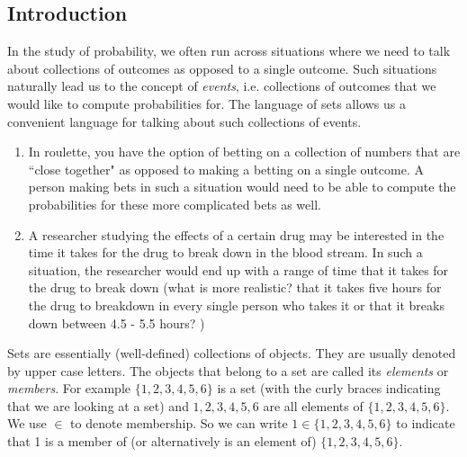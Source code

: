 \begin{appendices}
\section{Introduction}
		\noindent In the study of probability, we often run across situations where we need to talk about collections of outcomes as opposed to a single outcome. Such situations naturally lead us to the concept of \textit{events}, i.e. collections of outcomes that we would like to compute probabilities for. The language of sets allows us a convenient language for talking about such collections of events. 
		
		\begin{ex} 
			\begin{enumerate}
				\item In roulette, you have the option of betting on a collection of numbers that are ``close together" as opposed to making a betting on a single outcome. A person making bets in such a situation would need to be able to compute the probabilities for these more complicated bets as well.
				
				\item A researcher studying the effects of  a certain drug may be interested in the time it takes for the drug to break down in the blood stream. In such a situation, the researcher would end up with a range of time that it takes for the drug to break down (what is more realistic? that it takes five hours for the drug to breakdown in every single person who takes it or that it breaks down between 4.5 - 5.5 hours? ) 
			\end{enumerate} 
		\end{ex}
		
		Sets are essentially (well-defined) collections of objects. They are usually denoted by upper case letters. The objects that belong to a set are called its \textit{elements} or \textit{members}.  For example  $\{1,2,3,4,5,6\}$ is a set (with the curly braces indicating that we are looking at a set) and $1,2,3,4,5,6$ are all elements of $\{ 1,2,3,4,5,6 \}$. We use $\in$ to denote membership. So we can write $1\in\{1,2,3,4,5,6\}$ to indicate that 1 is a member of (or alternatively is an element of)  $\{1,2,3,4,5,6\}$.\\
		

\end{appendices}
